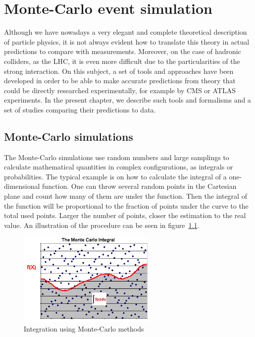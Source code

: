 \chapter[MC event generation]{Monte-Carlo event simulation}
\label{chap:MC}

Although we have nowadays a very elegant and complete theoretical description of particle physics, it is not always evident how to translate this theory in actual predictions to compare with measurements. Moreover, on the case of hadronic colliders, as the LHC, it is even more difficult due to the particularities of the strong interaction. On this subject, a set of tools and approaches have been developed in order to be able to make accurate predictions from theory that could be directly researched experimentally, for example by CMS or ATLAS experiments. In the present chapter, we describe such tools and formalisms and a set of studies comparing their predictions to data. 

\section{Monte-Carlo simulations}
\label{sec:MC}

The Monte-Carlo simulations use random numbers and large samplings to calculate mathematical quantities in complex configurations, as integrals or probabilities. The typical example is on how to calculate the integral of a one-dimensional function. One can throw several random points in the Cartesian plane and count how many of them are under the function. Then the integral of the function will be proportional to the fraction of points under the curve to the total used points. Larger the number of points, closer the estimation to the real value. An illustration of the procedure can be seen in figure~\ref{fig:mc_int}.

\begin{figure}[!Hhtbp]
  \begin{center}
    \includegraphics[width=0.6\textwidth]{figs/mc_integral.png}
    \caption{Integration using Monte-Carlo methods}
    \label{fig:mc_int}
  \end{center}
\end{figure}

